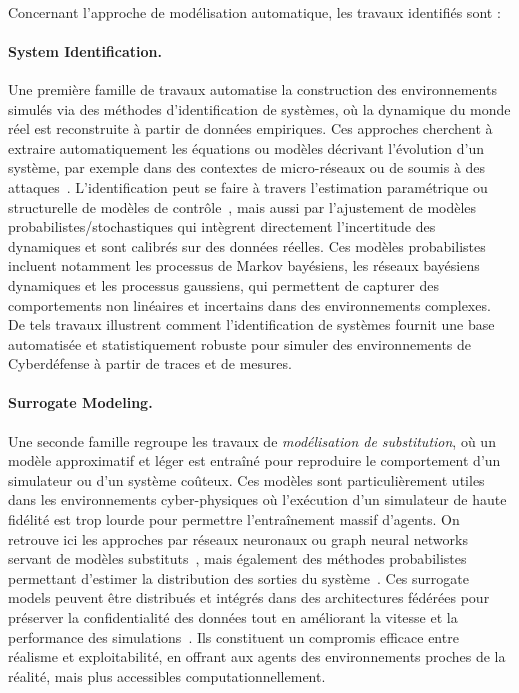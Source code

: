 \

Concernant l'approche de modélisation automatique, les travaux identifiés sont :

\paragraph{System Identification.}
Une première famille de travaux automatise la construction des environnements simulés via des méthodes d'identification de systèmes, où la dynamique du monde réel est reconstruite à partir de données empiriques. Ces approches cherchent à extraire automatiquement les équations ou modèles décrivant l'évolution d'un système, par exemple dans des contextes de micro-réseaux ou de  soumis à des attaques~\cite{NtDvjag65BgJ, tBI-_piWs1cJ}. L'identification peut se faire à travers l'estimation paramétrique ou structurelle de modèles de contrôle~\cite{g5PxHs45ZtYJ}, mais aussi par l'ajustement de modèles probabilistes/stochastiques qui intègrent directement l'incertitude des dynamiques et sont calibrés sur des données réelles. Ces modèles probabilistes incluent notamment les processus de Markov bayésiens, les réseaux bayésiens dynamiques et les processus gaussiens, qui permettent de capturer des comportements non linéaires et incertains dans des environnements complexes. De tels travaux illustrent comment l'identification de systèmes fournit une base automatisée et statistiquement robuste pour simuler des environnements de Cyberdéfense à partir de traces et de mesures.

\paragraph{Surrogate Modeling.}
Une seconde famille regroupe les travaux de \textit{modélisation de substitution}, où un modèle approximatif et léger est entraîné pour reproduire le comportement d'un simulateur ou d'un système coûteux. Ces modèles sont particulièrement utiles dans les environnements cyber-physiques où l'exécution d'un simulateur de haute fidélité est trop lourde pour permettre l'entraînement massif d'agents. On retrouve ici les approches par réseaux neuronaux ou graph neural networks servant de modèles substituts~\cite{g4qXIBHVJwUJ, Cr1JpifjcFwJ}, mais également des méthodes probabilistes permettant d'estimer la distribution des sorties du système~\cite{hPBZHSLGStkJ}. Ces surrogate models peuvent être distribués et intégrés dans des architectures fédérées pour préserver la confidentialité des données tout en améliorant la vitesse et la performance des simulations~\cite{g4qXIBHVJwUJ}. Ils constituent un compromis efficace entre réalisme et exploitabilité, en offrant aux agents des environnements proches de la réalité, mais plus accessibles computationnellement.

